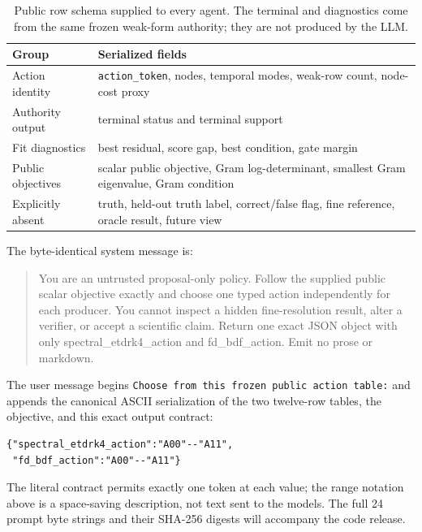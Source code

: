 \documentclass{article}
\begin{document}
\begin{table}[ht]
\centering\scriptsize
\caption{Public row schema supplied to every agent. The terminal and diagnostics come from the
same frozen weak-form authority; they are not produced by the LLM.}
\begin{tabular}{p{.27\linewidth}p{.64\linewidth}}
\toprule
Group & Serialized fields \\
\midrule
Action identity & \texttt{action\_token}, nodes, temporal modes, weak-row count, node-cost proxy \\
Authority output & terminal status and terminal support \\
Fit diagnostics & best residual, score gap, best condition, gate margin \\
Public objectives & scalar public objective, Gram log-determinant, smallest Gram eigenvalue, Gram condition \\
Explicitly absent & truth, held-out truth label, correct/false flag, fine reference, oracle result, future view \\
\bottomrule
\end{tabular}
\end{table}

\begin{minipage}{\linewidth}
The byte-identical system message is:
\begin{quote}
\small\ttfamily\raggedright
You are an untrusted proposal-only policy. Follow the supplied public scalar objective exactly and
choose one typed action independently for each producer. You cannot inspect a hidden
fine-resolution result, alter a verifier, or accept a scientific claim. Return one exact JSON
object with only spectral\_etdrk4\_action and fd\_bdf\_action. Emit no prose or markdown.
\end{quote}
\end{minipage}
The user message begins \texttt{Choose from this frozen public action table:} and appends the
canonical ASCII serialization of the two twelve-row tables, the objective, and this exact output
contract:
\begin{verbatim}
{"spectral_etdrk4_action":"A00"--"A11",
 "fd_bdf_action":"A00"--"A11"}
\end{verbatim}
The literal contract permits exactly one token at each value; the range notation above is a
space-saving description, not text sent to the models. The full 24 prompt byte strings and their
SHA-256 digests will accompany the code release.
\end{document}
